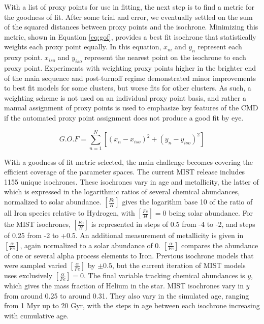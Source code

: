 \documentclass[onecolumn,table,xcdraw,super]{aastex631}
\newcommand{\beq}{\begin{equation}}
\newcommand{\eeq}{\end{equation}}
\begin{document}
With a list of proxy points for use in fitting, the next step is to find a metric for the goodness of fit. After some trial and error, we eventually settled on the sum of the squared distances between proxy points and the isochrone. Minimizing this metric, shown in Equation \ref{eq:gof}, provides a best fit isochrone that statistically weights each proxy point equally. In this equation, $x_m$ and $y_n$ represent each proxy point. $x_{iso}$ and $y_{iso}$ represent the nearest point on the isochrone to each proxy point. Experiments with weighting proxy points higher in the brighter end of the main sequence and post-turnoff regime demonstrated minor improvements to best fit models for some clusters, but worse fits for other clusters. As such, a weighting scheme is not used on an individual proxy point basis, and rather a manual assignment of proxy points is used to emphasize key features of the CMD if the automated proxy point assignment does not produce a good fit by eye.

\beq
\label{eq:gof}
G.O.F = \sum\limits_{n=1}^{N}\left[\left(x_n-x_{iso}\right)^2+\left(y_n-y_{iso}\right)^2\right]
\eeq

With a goodness of fit metric selected, the main challenge becomes covering the efficient coverage of the parameter spaces. The current MIST release includes 1155 unique isochrones. These isochrones vary in age and metallicity, the latter of which is expressed in the logarithmic ratios of several chemical abundances, normalized to solar abundance. $[\frac{Fe}{H}]$ gives the logarithm base 10 of the ratio of all Iron species relative to Hydrogen, with $[\frac{Fe}{H}]=0$ being solar abundance. For the MIST isochrones, $[\frac{Fe}{H}]$ is represented in steps of 0.5 from -4 to -2, and steps of 0.25 from -2 to +0.5. An additional measurement of metallicity is given in $[\frac{\alpha}{Fe}]$, again normalized to a solar abundance of 0. $[\frac{\alpha}{Fe}]$ compares the abundance of one or several alpha process elements to Iron. Previous isochrone models that were sampled varied $[\frac{\alpha}{Fe}]$ by $\pm 0.5$, but the current iteration of MIST models uses exclusively $[\frac{\alpha}{Fe}]=0$. The final variable tracking chemical abundances is $y$, which gives the mass fraction of Helium in the star. MIST isochrones vary in $y$ from around 0.25 to around 0.31. They also vary in the simulated age, ranging from 1 Myr up to 20 Gyr, with the steps in age between each isochrone increasing with cumulative age.
\end{document}
